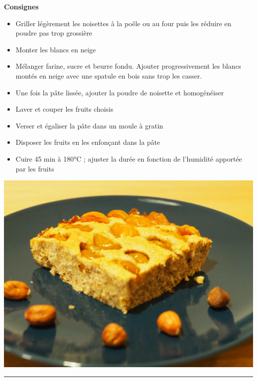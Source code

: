 \documentclass[]{book}
\providecommand{\tightlist}{%
  \setlength{\itemsep}{0pt}\setlength{\parskip}{0pt}}
\begin{document}
\textbf{Consignes}

\begin{itemize}
\tightlist
\item
  Griller légèrement les noisettes à la poêle ou au four puis les réduire en poudre pas trop grossière
\item
  Monter les blancs en neige
\item
  Mélanger farine, sucre et beurre fondu. Ajouter progressivement les blancs montés en neige avec une spatule en bois sans trop les casser.
\item
  Une fois la pâte lissée, ajouter la poudre de noisette et homogénéiser
\item
  Laver et couper les fruits choisis
\item
  Verser et égaliser la pâte dans un moule à gratin
\item
  Disposer les fruits en les enfonçant dans la pâte
\item
  Cuire 45 min à 180°C ; ajuster la durée en fonction de l'humidité apportée par les fruits
\end{itemize}

\begin{center}\includegraphics[width=0.9\linewidth]{photos/creusois} \end{center}

\begin{center}\rule{0.5\linewidth}{0.5pt}\end{center}
\end{document}
